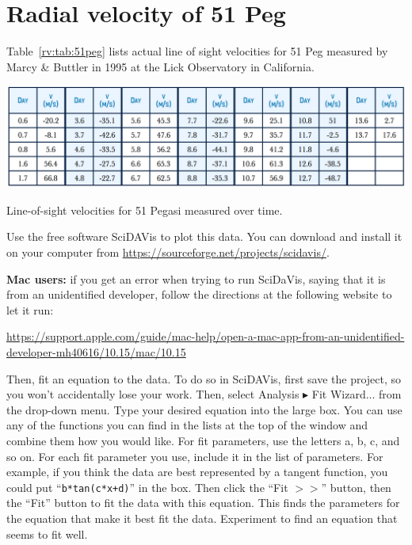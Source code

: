 \section{Radial velocity of 51 Peg}

Table~\ref{rv:tab:51peg} lists actual line of sight velocities for 51 Peg measured by Marcy \& Buttler in 1995 at the Lick Observatory in California.

\begin{table}
	\centering
	\includegraphics[width=\textwidth]{radial-velocity/51-peg-velocities}
	\caption{Line-of-sight velocities for 51 Pegasi measured over time.}\label{rv:tab:51peg}
\end{table}

Use the free software SciDAVis to plot this data. You can download and install it on your computer from \url{https://sourceforge.net/projects/scidavis/}.

\begin{framed}
\textbf{Mac users:} if you get an error when trying to run SciDaVis, saying that it is from an unidentified developer, follow the directions at the following website to let it run:

\url{https://support.apple.com/guide/mac-help/open-a-mac-app-from-an-unidentified-developer-mh40616/10.15/mac/10.15}
\end{framed}

Then, fit an equation to the data. To do so in SciDAVis, first save the project, so you won't accidentally lose your work. Then, select Analysis $\blacktriangleright$ Fit Wizard... from the drop-down menu. Type your desired equation into the large box. You can use any of the functions you can find in the lists at the top of the window and combine them how you would like. For fit parameters, use the letters a, b, c, and so on. For each fit parameter you use, include it in the list of parameters. For example, if you think the data are best represented by a tangent function, you could put ``\texttt{b*tan(c*x+d)}'' in the box. Then click the ``Fit $>>$'' button, then the ``Fit'' button to fit the data with this equation. This finds the parameters for the equation that make it best fit the data. Experiment to find an equation that seems to fit well.

